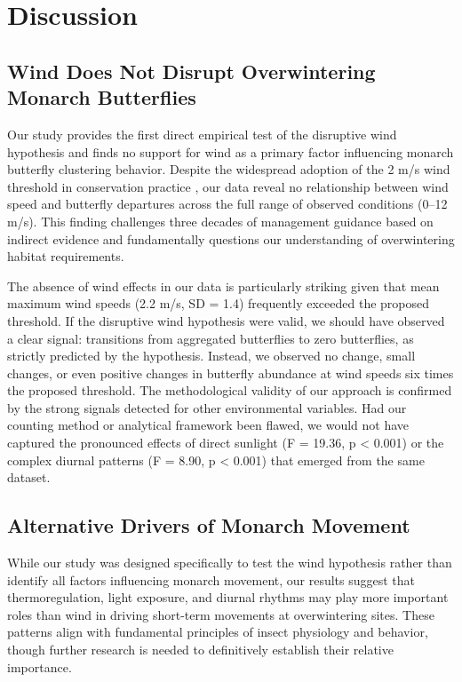 \section{Discussion}

\subsection{Wind Does Not Disrupt Overwintering Monarch Butterflies}

Our study provides the first direct empirical test of the disruptive wind hypothesis and finds no support for wind as a primary factor influencing monarch butterfly clustering behavior. Despite the widespread adoption of the 2 m/s wind threshold in conservation practice \autocite{xercesGuideWesternMonarch2025}, our data reveal no relationship between wind speed and butterfly departures across the full range of observed conditions (0--12 m/s). This finding challenges three decades of management guidance based on indirect evidence and fundamentally questions our understanding of overwintering habitat requirements.

The absence of wind effects in our data is particularly striking given that mean maximum wind speeds (2.2 m/s, SD = 1.4) frequently exceeded the proposed threshold. If the disruptive wind hypothesis were valid, we should have observed a clear signal: transitions from aggregated butterflies to zero butterflies, as strictly predicted by the hypothesis. Instead, we observed no change, small changes, or even positive changes in butterfly abundance at wind speeds six times the proposed threshold. The methodological validity of our approach is confirmed by the strong signals detected for other environmental variables. Had our counting method or analytical framework been flawed, we would not have captured the pronounced effects of direct sunlight (F = 19.36, p < 0.001) or the complex diurnal patterns (F = 8.90, p < 0.001) that emerged from the same dataset.

\subsection{Alternative Drivers of Monarch Movement}

While our study was designed specifically to test the wind hypothesis rather than identify all factors influencing monarch movement, our results suggest that thermoregulation, light exposure, and diurnal rhythms may play more important roles than wind in driving short-term movements at overwintering sites. These patterns align with fundamental principles of insect physiology and behavior, though further research is needed to definitively establish their relative importance.

